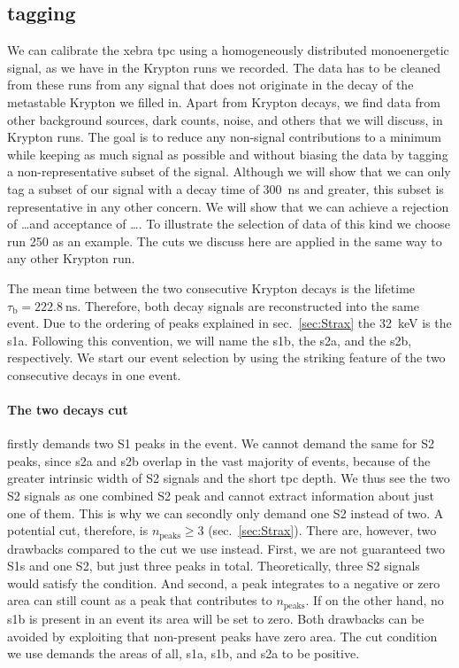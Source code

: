 
\FloatBarrier
\subsection{tagging}
\label{ssec:tagging}
\FloatBarrier



We can calibrate the \gls{xebra} \gls{tpc} using a homogeneously distributed monoenergetic signal, as we have in the Krypton runs we recorded.
The data has to be cleaned from these runs from any signal that does not originate in the decay of the metastable Krypton we filled in.
Apart from Krypton decays, we find data from other background sources, dark counts, noise, and others that we will discuss, in Krypton runs.
The goal is to reduce any non-signal contributions to a minimum while keeping as much signal as possible and without biasing the data by tagging a non-representative subset of the signal.
Although we will show that we can only tag a subset of our signal with a decay time of \SI{300}{\nano\s} and greater, this subset is representative in any other concern.
We will show that we can achieve a rejection of \dots and acceptance of \dots.  %
To illustrate the selection of data of this kind we choose run 250 as an example.
The cuts we discuss here are applied in the same way to any other Krypton run.


The mean time between the two consecutive Krypton decays is the lifetime $\tau_\mathrm{b} = \SI{222.8}{\nano\s}$.
Therefore, both decay signals are reconstructed into the same event.
Due to the ordering of peaks explained in sec.~\ref{sec:Strax} the \SI{32}{\kilo\eV} is the \gls{s1a}.
Following this convention, we will name the \gls{s1b}, the \gls{s2a}, and the \gls{s2b}, respectively.
We start our event selection by using the striking feature of the two consecutive decays in one event.


\paragraph{The two decays cut} firstly demands two S1 peaks in the event.
We cannot demand the same for S2 peaks, since \gls{s2a} and \gls{s2b} overlap in the vast majority of events, because of the greater intrinsic width of S2 signals and the short \gls{tpc} depth.
We thus see the two S2 signals as one combined S2 peak and cannot extract information about just one of them.
This is why we can secondly only demand one S2 instead of two.
A potential cut, therefore, is $n_\mathrm{peaks} \ge 3$ (sec.~\ref{sec:Strax}).
There are, however, two drawbacks compared to the cut we use instead.
First, we are not guaranteed two S1s and one S2, but just three peaks in total.
Theoretically, three S2 signals would satisfy the condition.
And second, a peak integrates to a negative or zero area can still count as a peak that contributes to $ n_\mathrm{peaks} $.
If on the other hand, no \gls{s1b} is present in an event its area will be set to zero.
Both drawbacks can be avoided by exploiting that non-present peaks have zero area.
The cut condition we use demands the areas of all, \gls{s1a}, \gls{s1b}, and \gls{s2a} to be positive.

